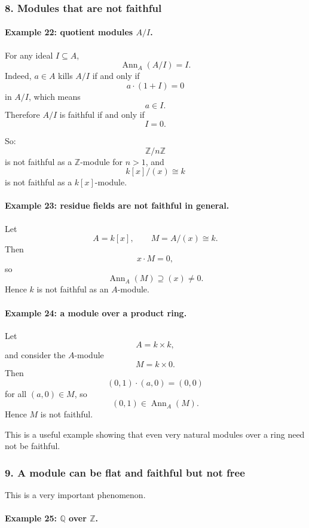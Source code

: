 \documentclass[12pt,a4paper]{article}
\theoremstyle{notespace}
\theoremstyle{definition}
\DeclareMathOperator{\Ann}{Ann}
\begin{document}
\subsubsection{8. Modules that are not faithful}

\paragraph{Example 22: quotient modules \(A/I\).}

For any ideal \(I\subseteq A\),
\[
\Ann_A(A/I)=I.
\]
Indeed, \(a\in A\) kills \(A/I\) if and only if
\[
a\cdot (1+I)=0
\]
in \(A/I\), which means
\[
a\in I.
\]
Therefore \(A/I\) is faithful if and only if
\[
I=0.
\]

So:
\[
\mathbb Z/n\mathbb Z
\]
is not faithful as a \(\mathbb Z\)-module for \(n>1\), and
\[
k[x]/(x)\cong k
\]
is not faithful as a \(k[x]\)-module.

\paragraph{Example 23: residue fields are not faithful in general.}

Let
\[
A=k[x],
\qquad
M=A/(x)\cong k.
\]
Then
\[
x\cdot M=0,
\]
so
\[
\Ann_A(M)\supseteq (x)\neq 0.
\]
Hence \(k\) is not faithful as an \(A\)-module.

\paragraph{Example 24: a module over a product ring.}

Let
\[
A=k\times k,
\]
and consider the \(A\)-module
\[
M=k\times 0.
\]
Then
\[
(0,1)\cdot (a,0)=(0,0)
\]
for all \((a,0)\in M\), so
\[
(0,1)\in \Ann_A(M).
\]
Hence \(M\) is not faithful.

This is a useful example showing that even very natural modules over a ring need not be faithful.

\subsubsection{9. A module can be flat and faithful but not free}

This is a very important phenomenon.

\paragraph{Example 25: \(\mathbb Q\) over \(\mathbb Z\).}
\end{document}
